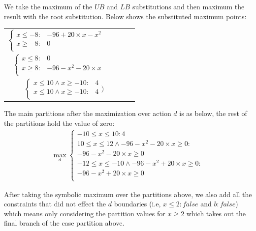 \documentclass[letterpaper]{article}
\begin{document}
We take the maximum of the $\mathit{UB}$ and $\mathit{LB}$  substitutions and then maximum the result with the root substitution. Below shows the substituted maximum points:

{\footnotesize
\begin{center}
\begin{tabular} {r c c c l}
\hspace{-4mm}
$
\begin{cases}
x \leq -8 : & -96 + 20 \times x - x^2 \\ 
x \geq -8 : & 0 \\ 
\end{cases} $

\\
\hspace{-4mm}
$ \begin{cases}
x \leq 8 : & 0 \\ 
x \geq 8: & -96 -x^2 -20\times x\\
\end{cases}$
\hspace{-4mm} 
\\
\hspace{-4mm}
$\begin{cases}
x \leq 10 \wedge x \geq -10 : & 4 \\ 
x \leq 10 \wedge x \geq -10 : & 4 \\ 
\end{cases})$
\end{tabular}
\end{center}
}

The main partitions after the maximization over action $d$ is as below, the rest of the partitions hold the value of zero: 
\begin{align*}
\max_{d}
\begin{cases}
-10 \leq x \leq 10 : 4 \\ 
10 \leq x \leq 12  \wedge  -96-x^2-20\times x \geq 0: \\ -96-x^2-20\times x \geq 0 \\ 
-12 \leq x \leq -10  \wedge  -96-x^2+20\times x \geq 0:\\ -96-x^2+20\times x \geq 0 \\
  \end{cases}
\end{align*}

After taking the symbolic maximum over the partitions above, we also add all the constraints that did not effect the $d$ boundaries (i.e, $x\leq 2:false $ and $b:false$) which means only considering the partition values for $x \geq 2$ which takes out the final branch of the case partition above. 
\end{document}
